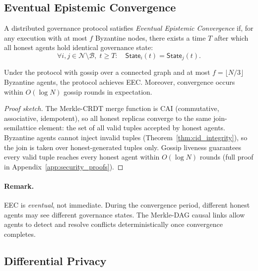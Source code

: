 \subsection{Eventual Epistemic Convergence}

\begin{definition}
  \label{def:eec}
  A distributed governance protocol satisfies \emph{Eventual Epistemic Convergence}
  if, for any execution with at most $f$ Byzantine nodes, there exists a time $T$ after
  which all honest agents hold identical governance state:
  \[
    \forall i, j \in \mathcal{N} \setminus \mathcal{B},\; t \geq T:\quad
      \mathsf{State}_i(t) = \mathsf{State}_j(t).
  \]
\end{definition}

\begin{theorem}
  \label{thm:eec}
  Under the \fedsink{} protocol with gossip over a connected graph and at most
  $f = \lfloor N/3 \rfloor$ Byzantine agents, the protocol achieves EEC.  Moreover,
  convergence occurs within $O(\log N)$ gossip rounds in expectation.
\end{theorem}

\begin{proof}[Proof sketch]
  The Merkle-CRDT merge function is CAI (commutative, associative, idempotent), so all
  honest replicas converge to the same join-semilattice element: the set of all valid
  tuples accepted by honest agents.  Byzantine agents cannot inject invalid tuples
  (Theorem~\ref{thm:cid_integrity}), so the join is taken over honest-generated tuples
  only.  Gossip liveness \cite{eugster2004epidemic} guarantees every valid tuple reaches
  every honest agent within $O(\log N)$ rounds (full proof in
  Appendix~\ref{app:security_proofs}).
\end{proof}

\paragraph{Remark.}
EEC is \emph{eventual}, not immediate.  During the convergence period, different honest
agents may see different governance states.  The Merkle-DAG causal links allow agents to
detect and resolve conflicts deterministically once convergence completes.

\subsection{Differential Privacy}


